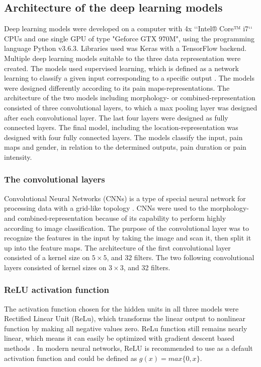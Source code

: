 \subsection*{\textbf{Architecture of the deep learning models}}
Deep learning models were developed on a computer with 4x ‘‘Intel® Core™ i7‘‘ CPUs and one single GPU of type "Geforce GTX 970M", using the programming language Python v3.6.3. Libraries used was Keras with a TensorFlow backend. \newline
\noindent
Multiple deep learning models suitable to the three data representation were created. The models used supervised learning, which is defined as a network learning to classify a given input corresponding to a specific output \citep{Goodfellow2016}. The models were designed differently according to its pain maps-representations. The architecture of the two models including morphology- or combined-representation consisted of three convolutional layers, to which a max pooling layer was designed after each convolutional layer. The last four layers were designed as fully connected layers. The final model, including the location-representation was designed with four fully connected layers. 
The models classify the input, pain maps and gender, in relation to the determined outputs, pain duration or pain intensity.\newline

\subsubsection*{\textbf{The convolutional layers}}
Convolutional Neural Networks (CNNs) is a type of special neural network for processing data with a grid-like topology \citep{Goodfellow2016}. CNNs were used to the morphology- and combined-representation because of its capability to perform highly according to image classification. The purpose of the convolutional layer was to recognize the features in the input by taking the image and scan it, then split it up into the feature maps.\citep{Goodfellow2016,LeCun1998} The architecture of the first convolutional layer consisted of a kernel size on $5 \times 5$, and 32 filters. The two following convolutional layers consisted of kernel sizes on $3 \times 3$, and 32 filters. 

\subsubsection*{\textbf{ReLU activation function}}
The activation function chosen for the hidden units in all three models were Rectified Linear Unit (ReLu), which transforms the linear output to nonlinear function by making all negative values zero. ReLu function still remains nearly linear, which means it can easily be optimized with gradient descent based methods \citep{Goodfellow2016}. In modern neural networks, ReLU is recommended to use as a default activation function and could be defined as $g(x) = max\{0, x\}$. 



